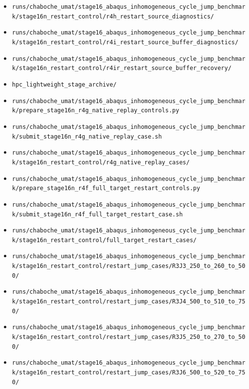 \documentclass[11pt,a4paper]{article}
\newcommand{\code}[1]{\texttt{#1}}
\begin{document}
\begin{itemize}
  \item \code{runs/chaboche\_umat/stage16\_abaqus\_inhomogeneous\_cycle\_jump\_benchmark/stage16n\_restart\_control/r4h\_restart\_source\_diagnostics/}
  \item \code{runs/chaboche\_umat/stage16\_abaqus\_inhomogeneous\_cycle\_jump\_benchmark/stage16n\_restart\_control/r4i\_restart\_source\_buffer\_diagnostics/}
  \item \code{runs/chaboche\_umat/stage16\_abaqus\_inhomogeneous\_cycle\_jump\_benchmark/stage16n\_restart\_control/r4ir\_restart\_source\_buffer\_recovery/}
  \item \code{hpc\_lightweight\_stage\_archive/}
  \item \code{runs/chaboche\_umat/stage16\_abaqus\_inhomogeneous\_cycle\_jump\_benchmark/prepare\_stage16n\_r4g\_native\_replay\_controls.py}
  \item \code{runs/chaboche\_umat/stage16\_abaqus\_inhomogeneous\_cycle\_jump\_benchmark/submit\_stage16n\_r4g\_native\_replay\_case.sh}
  \item \code{runs/chaboche\_umat/stage16\_abaqus\_inhomogeneous\_cycle\_jump\_benchmark/stage16n\_restart\_control/r4g\_native\_replay\_cases/}
  \item \code{runs/chaboche\_umat/stage16\_abaqus\_inhomogeneous\_cycle\_jump\_benchmark/prepare\_stage16n\_r4f\_full\_target\_restart\_controls.py}
  \item \code{runs/chaboche\_umat/stage16\_abaqus\_inhomogeneous\_cycle\_jump\_benchmark/submit\_stage16n\_r4f\_full\_target\_restart\_case.sh}
  \item \code{runs/chaboche\_umat/stage16\_abaqus\_inhomogeneous\_cycle\_jump\_benchmark/stage16n\_restart\_control/full\_target\_restart\_cases/}
  \item \code{runs/chaboche\_umat/stage16\_abaqus\_inhomogeneous\_cycle\_jump\_benchmark/stage16n\_restart\_control/restart\_jump\_cases/R3J3\_250\_to\_260\_to\_500/}
  \item \code{runs/chaboche\_umat/stage16\_abaqus\_inhomogeneous\_cycle\_jump\_benchmark/stage16n\_restart\_control/restart\_jump\_cases/R3J4\_500\_to\_510\_to\_750/}
  \item \code{runs/chaboche\_umat/stage16\_abaqus\_inhomogeneous\_cycle\_jump\_benchmark/stage16n\_restart\_control/restart\_jump\_cases/R3J5\_250\_to\_270\_to\_500/}
  \item \code{runs/chaboche\_umat/stage16\_abaqus\_inhomogeneous\_cycle\_jump\_benchmark/stage16n\_restart\_control/restart\_jump\_cases/R3J6\_500\_to\_520\_to\_750/}

\end{itemize}
\end{document}
